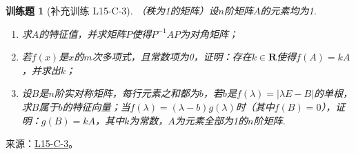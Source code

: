 \documentclass[12pt,fontset=fandol]{ctexart}
\newtheorem{exercise}{训练题}[section]
\begin{document}
\begin{exercise}[补充训练 L15-C-3]\label{prob:L15-C-3}
（秩为1的矩阵）设$n$阶矩阵$A$的元素均为1.
        \begin{enumerate}
            \item 求$A$的特征值，并求矩阵$P$使得$P^{-1}AP$为对角矩阵；

            \item 若$f(x)$是$x$的$m$次多项式，且常数项为0，证明：存在$k\in\mathbf{R}$使得$f(A)=kA$，并求出$k$；

            \item 设$B$是$n$阶实对称矩阵，每行元素之和都为$b$，若$b$是$f(\lambda)=|\lambda E-B|$的单根，求$B$属于$b$的特征向量；当$f(\lambda)=(\lambda-b)g(\lambda)$时（其中$f(B)=0$），证明：$g(B)=kA$，其中$k$为常数，$A$为元素全部为1的$n$阶矩阵.
        \end{enumerate}
\end{exercise}
\noindent 来源：\href{https://github.com/yhwu-is/Linear-Algebra-Left-Undone/blob/new/%E8%AE%B2%E4%B9%89/%E4%B8%93%E9%A2%98/15%20%E7%9B%B8%E4%BC%BC%E6%A0%87%E5%87%86%E5%BD%A2%EF%BC%9A%E5%A4%8D%E6%95%B0%E5%9F%9F%E4%B8%8A%E7%9A%84%E5%B0%9D%E8%AF%95%E4%B8%8E%E7%90%86%E8%AE%BA.tex}{L15-C-3}。
\end{document}

